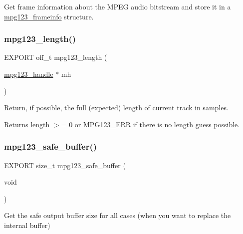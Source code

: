 Get frame information about the M\+P\+EG audio bitstream and store it in a \hyperlink{structmpg123__frameinfo}{mpg123\+\_\+frameinfo} structure. \mbox{\label{group__mpg123__status_gad61062a7c127fda0d1ccee4ca0db37b4}} 
\subsubsection{\texorpdfstring{mpg123\+\_\+length()}{mpg123\_length()}}
{\footnotesize\ttfamily E\+X\+P\+O\+RT off\+\_\+t mpg123\+\_\+length (\begin{DoxyParamCaption}\item[{\hyperlink{group__mpg123__init_ga6728e2839a395f3a07d4514da659faca}{mpg123\+\_\+handle} $\ast$}]{mh }\end{DoxyParamCaption})}

Return, if possible, the full (expected) length of current track in samples. \begin{DoxyReturn}{Returns}
length $>$= 0 or M\+P\+G123\+\_\+\+E\+RR if there is no length guess possible. 
\end{DoxyReturn}
\mbox{\label{group__mpg123__status_gac5d057e3d7e859fc5cdf24dd34735233}} 
\subsubsection{\texorpdfstring{mpg123\+\_\+safe\+\_\+buffer()}{mpg123\_safe\_buffer()}}
{\footnotesize\ttfamily E\+X\+P\+O\+RT size\+\_\+t mpg123\+\_\+safe\+\_\+buffer (\begin{DoxyParamCaption}\item[{void}]{ }\end{DoxyParamCaption})}

Get the safe output buffer size for all cases (when you want to replace the internal buffer) \mbox{\label{group__mpg123__status_ga42e4ddc8d68580ef11105a7c017862a0}} 
